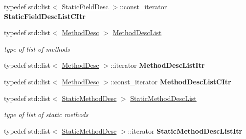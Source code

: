 \begin{DoxyCompactItemize}
\item 
typedef std\+::list$<$ \hyperlink{classagm_1_1reflection_1_1_static_field_desc}{Static\+Field\+Desc} $>$\+::const\+\_\+iterator {\bfseries Static\+Field\+Desc\+List\+C\+Itr}\hypertarget{classagm_1_1reflection_1_1_class_desc_a91db11a1e5b4b0273875e5ff063e7122}{}\label{classagm_1_1reflection_1_1_class_desc_a91db11a1e5b4b0273875e5ff063e7122}

\item 
typedef std\+::list$<$ \hyperlink{classagm_1_1reflection_1_1_method_desc}{Method\+Desc} $>$ \hyperlink{classagm_1_1reflection_1_1_class_desc_aa107068fb197533acdf45241e6935abf}{Method\+Desc\+List}\hypertarget{classagm_1_1reflection_1_1_class_desc_aa107068fb197533acdf45241e6935abf}{}\label{classagm_1_1reflection_1_1_class_desc_aa107068fb197533acdf45241e6935abf}

\begin{DoxyCompactList}\small\item\em type of list of methods \end{DoxyCompactList}\item 
typedef std\+::list$<$ \hyperlink{classagm_1_1reflection_1_1_method_desc}{Method\+Desc} $>$\+::iterator {\bfseries Method\+Desc\+List\+Itr}\hypertarget{classagm_1_1reflection_1_1_class_desc_aa27c44e4f56166fb1f82147246056261}{}\label{classagm_1_1reflection_1_1_class_desc_aa27c44e4f56166fb1f82147246056261}

\item 
typedef std\+::list$<$ \hyperlink{classagm_1_1reflection_1_1_method_desc}{Method\+Desc} $>$\+::const\+\_\+iterator {\bfseries Method\+Desc\+List\+C\+Itr}\hypertarget{classagm_1_1reflection_1_1_class_desc_a425dd0aa46653728866df0fef1a48721}{}\label{classagm_1_1reflection_1_1_class_desc_a425dd0aa46653728866df0fef1a48721}

\item 
typedef std\+::list$<$ \hyperlink{classagm_1_1reflection_1_1_static_method_desc}{Static\+Method\+Desc} $>$ \hyperlink{classagm_1_1reflection_1_1_class_desc_ae73db259edf46f31948cada96b9067bb}{Static\+Method\+Desc\+List}\hypertarget{classagm_1_1reflection_1_1_class_desc_ae73db259edf46f31948cada96b9067bb}{}\label{classagm_1_1reflection_1_1_class_desc_ae73db259edf46f31948cada96b9067bb}

\begin{DoxyCompactList}\small\item\em type of list of static methods \end{DoxyCompactList}\item 
typedef std\+::list$<$ \hyperlink{classagm_1_1reflection_1_1_static_method_desc}{Static\+Method\+Desc} $>$\+::iterator {\bfseries Static\+Method\+Desc\+List\+Itr}\hypertarget{classagm_1_1reflection_1_1_class_desc_a3886e31737a9c77248e491f9ecbe478f}{}\label{classagm_1_1reflection_1_1_class_desc_a3886e31737a9c77248e491f9ecbe478f}


\end{DoxyCompactItemize}
